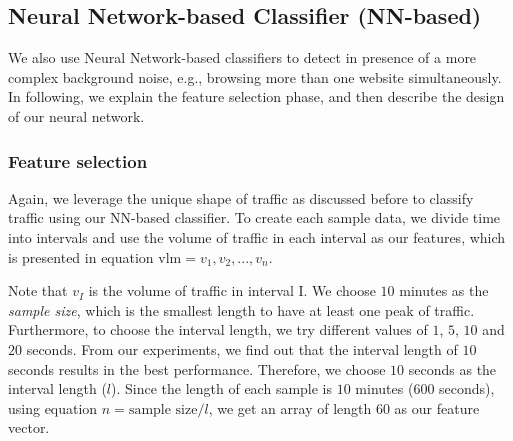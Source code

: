  
\subsection{Neural Network-based Classifier (NN-based)}\label{class:nn}
We also use Neural Network-based classifiers to detect \bc in presence of a more complex background noise, e.g., browsing more than one website simultaneously. In following, we explain the feature selection phase, and then describe the design of our neural network.
\subsubsection{Feature selection}
Again, we leverage the unique shape of \bc traffic as discussed before to classify \bc traffic using our NN-based classifier. To create each sample data, we divide time into intervals
and use the volume of traffic in each interval as our features, which is 
presented in equation $\mbox{vlm}=v_1, v_2, ..., v_{n}$. 

Note that $v_I$ is the volume of traffic in interval I. We choose $10$ minutes as the \textit{sample size}, which is the smallest length to have
at least one peak of traffic. Furthermore, to choose the interval
length, we try different values of $1$, $5$, $10$ and $20$ seconds. From our experiments, we find out 
that the interval length of $10$ seconds results in the best performance. Therefore, we choose $10$ 
seconds as the interval length ($l$). 
Since the length of each sample is $10$ minutes 
($600$ seconds), using equation $n=\mbox{sample size}/l$, we get an array of 
length $60$ as our feature vector.
\iffalse
\begin{equation}\label{eq:v}
 n=\mbox{sample size}/l
\end{equation}
\begin{equation}\label{eq:a}
\mbox{vlm}=v_1, v_2, ..., v_{n}
\end{equation}\fi
